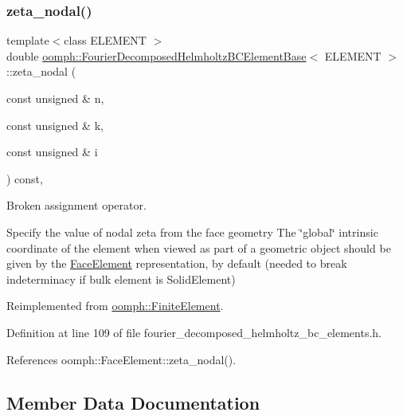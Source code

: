 \subsubsection{\texorpdfstring{zeta\+\_\+nodal()}{zeta\_nodal()}}
{\footnotesize\ttfamily template$<$class E\+L\+E\+M\+E\+NT $>$ \\
double \hyperlink{classoomph_1_1FourierDecomposedHelmholtzBCElementBase}{oomph\+::\+Fourier\+Decomposed\+Helmholtz\+B\+C\+Element\+Base}$<$ E\+L\+E\+M\+E\+NT $>$\+::zeta\+\_\+nodal (\begin{DoxyParamCaption}\item[{const unsigned \&}]{n,  }\item[{const unsigned \&}]{k,  }\item[{const unsigned \&}]{i }\end{DoxyParamCaption}) const\hspace{0.3cm}{\ttfamily [inline]}, {\ttfamily [virtual]}}



Broken assignment operator. 

Specify the value of nodal zeta from the face geometry The \char`\"{}global\char`\"{} intrinsic coordinate of the element when viewed as part of a geometric object should be given by the \hyperlink{classoomph_1_1FaceElement}{Face\+Element} representation, by default (needed to break indeterminacy if bulk element is Solid\+Element) 

Reimplemented from \hyperlink{classoomph_1_1FiniteElement_a849561c5fbcbc07dc49d2dc6cca68559}{oomph\+::\+Finite\+Element}.



Definition at line 109 of file fourier\+\_\+decomposed\+\_\+helmholtz\+\_\+bc\+\_\+elements.\+h.



References oomph\+::\+Face\+Element\+::zeta\+\_\+nodal().



\subsection{Member Data Documentation}
\mbox{\label{classoomph_1_1FourierDecomposedHelmholtzBCElementBase_a836256b4347acf9f496bc8eff0204866}} 
